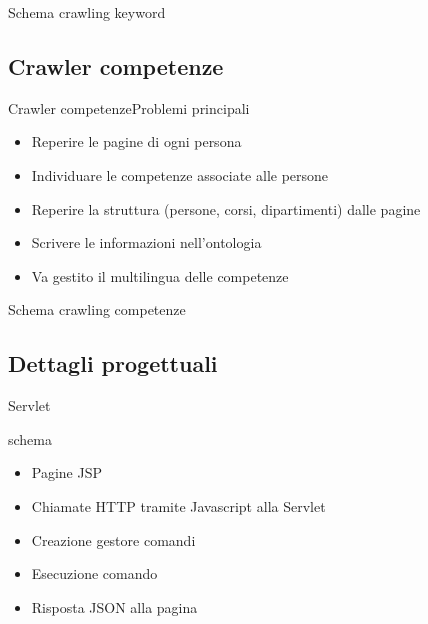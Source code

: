 \documentclass[dvips, 11pt]{beamer}
\begin{document}
\begin{frame}{Schema crawling keyword}
  
\end{frame}

\subsection{Crawler competenze}

\begin{frame}{Crawler competenze}{Problemi principali}
  \begin{itemize}
  \item Reperire le pagine di ogni persona
    \pause
  \item Individuare le \alert{competenze} associate alle persone
    \pause
  \item Reperire la \alert{struttura} (persone, corsi, dipartimenti) dalle pagine
    \pause
  \item Scrivere le informazioni nell'\alert{ontologia}
    \pause
  \item Va gestito il \alert{multilingua} delle competenze
  \end{itemize}
\end{frame}

\begin{frame}{Schema crawling competenze}
  
\end{frame}

\subsection{Dettagli progettuali}

\begin{frame}{Servlet}
  \begin{block}{schema}
    
  \end{block}
  \pause
  \begin{itemize}
    \item Pagine \alert{JSP}
      \pause
    \item Chiamate \alert{HTTP} tramite \alert{Javascript} alla \alert{Servlet}
      \pause
    \item Creazione \alert{gestore comandi}
      \pause
    \item Esecuzione comando
      \pause
    \item Risposta \alert{JSON} alla pagina
  \end{itemize}
\end{frame}
\end{document}
